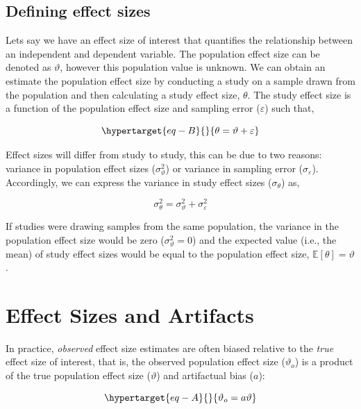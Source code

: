 \documentclass[
  letterpaper,
  DIV=11,
  numbers=noendperiod]{scrreprt}
\begin{document}
\hypertarget{defining-effect-sizes}{%
\subsection{Defining effect sizes}\label{defining-effect-sizes}}

Lets say we have an effect size of interest that quantifies the
relationship between an independent and dependent variable. The
population effect size can be denoted as \(\vartheta\), however this
population value is unknown. We can obtain an estimate the population
effect size by conducting a study on a sample drawn from the population
and then calculating a study effect size, \(\theta\). The study effect
size is a function of the population effect size and sampling error
(\(\varepsilon\)) such that,

\begin{equation}\protect\hypertarget{eq-B}{}{
\theta = \vartheta + \varepsilon
}\label{eq-B}\end{equation}

Effect sizes will differ from study to study, this can be due to two
reasons: variance in population effect sizes (\(\sigma^2_\vartheta\)) or
variance in sampling error (\(\sigma_\varepsilon\)). Accordingly, we can
express the variance in study effect sizes (\(\sigma_\theta\)) as,

\[
\sigma^2_\theta = \sigma^2_\vartheta + \sigma^2_\varepsilon
\]

If studies were drawing samples from the same population, the variance
in the population effect size would be zero (\(\sigma^2_\vartheta = 0\))
and the expected value (i.e., the mean) of study effect sizes would be
equal to the population effect size, \(\mathbb{E}[\theta]=\vartheta\).

\hypertarget{effect-sizes-and-artifacts}{%
\section{Effect Sizes and Artifacts}\label{effect-sizes-and-artifacts}}

In practice, \emph{observed} effect size estimates are often biased
relative to the \emph{true} effect size of interest, that is, the
observed population effect size (\(\vartheta_o\)) is a product of the
true population effect size (\(\vartheta\)) and artifactual bias
(\(a\)):

\begin{equation}\protect\hypertarget{eq-A}{}{
\vartheta_o = a\vartheta
}\label{eq-A}\end{equation}
\end{document}
